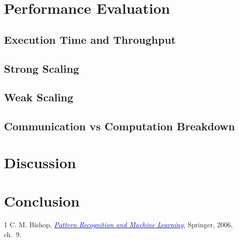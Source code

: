 \documentclass[conference]{IEEEtran}
\begin{document}
\section{Performance Evaluation}
\subsection{Execution Time and Throughput}
\subsection{Strong Scaling}
\subsection{Weak Scaling}
\subsection{Communication vs Computation Breakdown}

\section{Discussion}

\section{Conclusion}

\clearpage
\begin{thebibliography}{1}
 C. M. Bishop, \href{https://www.microsoft.com/en-us/research/uploads/prod/2006/01/Bishop-Pattern-Recognition-and-Machine-Learning-2006.pdf}{\textcolor{blue}{\emph{Pattern Recognition and Machine Learning}}}, Springer, 2006, ch.~9.
\end{thebibliography}
\end{document}
